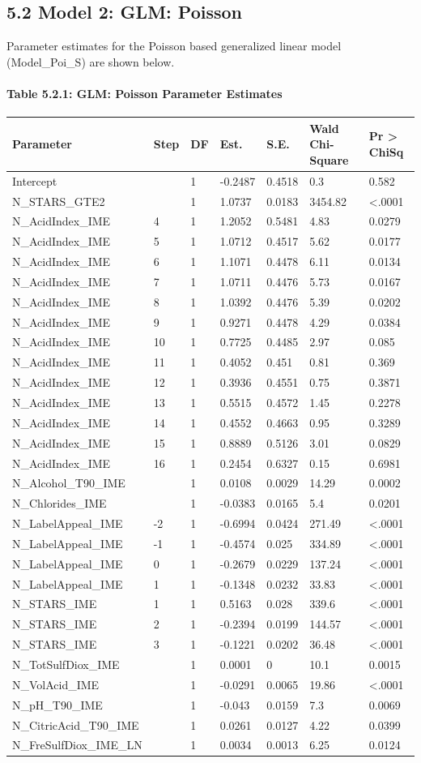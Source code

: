 \documentclass[]{article}
\let\oldparagraph\paragraph
\renewcommand{\paragraph}[1]{\oldparagraph{#1}\mbox{}}
\begin{document}
\subsection{5.2 Model 2: GLM: Poisson}\label{model-2-glm-poisson}

Parameter estimates for the Poisson based generalized linear model
(Model\_Poi\_S) are shown below.

\paragraph{Table 5.2.1: GLM: Poisson Parameter
Estimates}\label{table-5.2.1-glm-poisson-parameter-estimates}

\begin{longtable}[]{@{}lllllll@{}}
\toprule
Parameter & Step & DF & Est. & S.E. & Wald Chi-Square & Pr
\textgreater{} ChiSq\tabularnewline
\midrule
\endhead
Intercept & & 1 & -0.2487 & 0.4518 & 0.3 & 0.582\tabularnewline
N\_STARS\_GTE2 & & 1 & 1.0737 & 0.0183 & 3454.82 &
\textless{}.0001\tabularnewline
N\_AcidIndex\_IME & 4 & 1 & 1.2052 & 0.5481 & 4.83 &
0.0279\tabularnewline
N\_AcidIndex\_IME & 5 & 1 & 1.0712 & 0.4517 & 5.62 &
0.0177\tabularnewline
N\_AcidIndex\_IME & 6 & 1 & 1.1071 & 0.4478 & 6.11 &
0.0134\tabularnewline
N\_AcidIndex\_IME & 7 & 1 & 1.0711 & 0.4476 & 5.73 &
0.0167\tabularnewline
N\_AcidIndex\_IME & 8 & 1 & 1.0392 & 0.4476 & 5.39 &
0.0202\tabularnewline
N\_AcidIndex\_IME & 9 & 1 & 0.9271 & 0.4478 & 4.29 &
0.0384\tabularnewline
N\_AcidIndex\_IME & 10 & 1 & 0.7725 & 0.4485 & 2.97 &
0.085\tabularnewline
N\_AcidIndex\_IME & 11 & 1 & 0.4052 & 0.451 & 0.81 &
0.369\tabularnewline
N\_AcidIndex\_IME & 12 & 1 & 0.3936 & 0.4551 & 0.75 &
0.3871\tabularnewline
N\_AcidIndex\_IME & 13 & 1 & 0.5515 & 0.4572 & 1.45 &
0.2278\tabularnewline
N\_AcidIndex\_IME & 14 & 1 & 0.4552 & 0.4663 & 0.95 &
0.3289\tabularnewline
N\_AcidIndex\_IME & 15 & 1 & 0.8889 & 0.5126 & 3.01 &
0.0829\tabularnewline
N\_AcidIndex\_IME & 16 & 1 & 0.2454 & 0.6327 & 0.15 &
0.6981\tabularnewline
N\_Alcohol\_T90\_IME & & 1 & 0.0108 & 0.0029 & 14.29 &
0.0002\tabularnewline
N\_Chlorides\_IME & & 1 & -0.0383 & 0.0165 & 5.4 & 0.0201\tabularnewline
N\_LabelAppeal\_IME & -2 & 1 & -0.6994 & 0.0424 & 271.49 &
\textless{}.0001\tabularnewline
N\_LabelAppeal\_IME & -1 & 1 & -0.4574 & 0.025 & 334.89 &
\textless{}.0001\tabularnewline
N\_LabelAppeal\_IME & 0 & 1 & -0.2679 & 0.0229 & 137.24 &
\textless{}.0001\tabularnewline
N\_LabelAppeal\_IME & 1 & 1 & -0.1348 & 0.0232 & 33.83 &
\textless{}.0001\tabularnewline
N\_STARS\_IME & 1 & 1 & 0.5163 & 0.028 & 339.6 &
\textless{}.0001\tabularnewline
N\_STARS\_IME & 2 & 1 & -0.2394 & 0.0199 & 144.57 &
\textless{}.0001\tabularnewline
N\_STARS\_IME & 3 & 1 & -0.1221 & 0.0202 & 36.48 &
\textless{}.0001\tabularnewline
N\_TotSulfDiox\_IME & & 1 & 0.0001 & 0 & 10.1 & 0.0015\tabularnewline
N\_VolAcid\_IME & & 1 & -0.0291 & 0.0065 & 19.86 &
\textless{}.0001\tabularnewline
N\_pH\_T90\_IME & & 1 & -0.043 & 0.0159 & 7.3 & 0.0069\tabularnewline
N\_CitricAcid\_T90\_IME & & 1 & 0.0261 & 0.0127 & 4.22 &
0.0399\tabularnewline
N\_FreSulfDiox\_IME\_LN & & 1 & 0.0034 & 0.0013 & 6.25 &
0.0124\tabularnewline
\bottomrule
\end{longtable}
\end{document}
